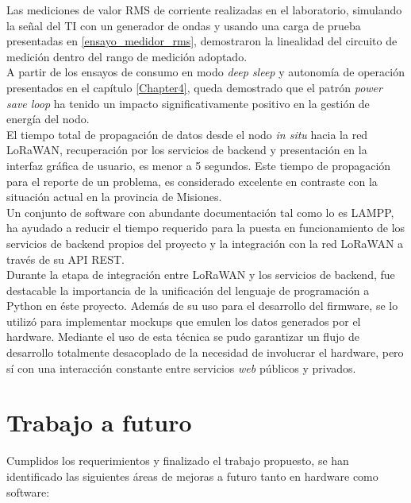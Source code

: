 Las mediciones de valor RMS de corriente realizadas en el laboratorio, simulando la señal del TI con un generador de ondas y usando una carga de prueba presentadas en \ref{ensayo_medidor_rms}, demostraron la linealidad del circuito de medición dentro del rango de medición adoptado.\\
A partir de los ensayos de consumo en modo \textit{deep sleep} y autonomía de operación presentados en el capítulo \ref{Chapter4}, queda demostrado que el patrón \textit{power save loop} ha tenido un impacto significativamente positivo en la gestión de energía del nodo.\\
El tiempo total de propagación de datos desde el nodo \textit{in situ} hacia la red LoRaWAN, recuperación por los servicios de backend y presentación en la interfaz gr\'{a}fica de usuario, es menor a 5 segundos. Este tiempo de propagación para el reporte de un problema, es considerado excelente en contraste con la situación actual en la provincia de Misiones.\\
Un conjunto de software con abundante documentación tal como lo es LAMPP, ha ayudado a reducir el tiempo requerido para la puesta en funcionamiento de los servicios de backend propios del proyecto y la integración con la red LoRaWAN a través de su API REST.\\
Durante la etapa de integración entre LoRaWAN y los servicios de backend, fue destacable la importancia de la unificación del lenguaje de programación a Python en \'{e}ste proyecto. Además de su uso para el desarrollo del firmware, se lo utilizó para implementar mockups que emulen los datos generados por el hardware. Mediante el uso de esta técnica se pudo garantizar un flujo de desarrollo totalmente desacoplado de la necesidad de involucrar el hardware, pero sí con una interacción constante entre servicios \textit{web} públicos y privados.\\


\section{Trabajo a futuro}

Cumplidos los requerimientos y finalizado el trabajo propuesto, se han identificado las siguientes áreas de mejoras a futuro tanto en hardware como software:


